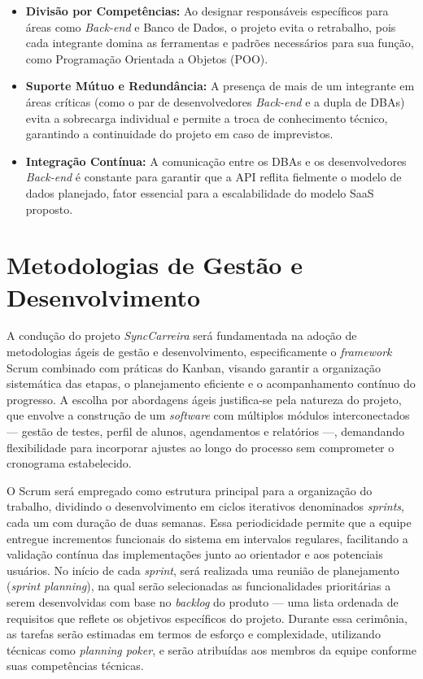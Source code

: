 \begin{itemize}
    \item \textbf{Divisão por Competências:} Ao designar responsáveis específicos para áreas como \textit{Back-end} e Banco de Dados, o projeto evita o retrabalho, pois cada integrante domina as ferramentas e padrões necessários para sua função, como Programação Orientada a Objetos (POO).

    \item \textbf{Suporte Mútuo e Redundância:} A presença de mais de um integrante em áreas críticas (como o par de desenvolvedores \textit{Back-end} e a dupla de DBAs) evita a sobrecarga individual e permite a troca de conhecimento técnico, garantindo a continuidade do projeto em caso de imprevistos.

    \item \textbf{Integração Contínua:} A comunicação entre os DBAs e os desenvolvedores \textit{Back-end} é constante para garantir que a API reflita fielmente o modelo de dados planejado, fator essencial para a escalabilidade do modelo SaaS proposto.
\end{itemize}

\section{Metodologias de Gestão e Desenvolvimento}

A condução do projeto \textit{SyncCarreira} será fundamentada na adoção de metodologias ágeis de gestão e desenvolvimento, especificamente o \textit{framework} Scrum combinado com práticas do Kanban, visando garantir a organização sistemática das etapas, o planejamento eficiente e o acompanhamento contínuo do progresso. A escolha por abordagens ágeis justifica-se pela natureza do projeto, que envolve a construção de um \textit{software} com múltiplos módulos interconectados --- gestão de testes, perfil de alunos, agendamentos e relatórios ---, demandando flexibilidade para incorporar ajustes ao longo do processo sem comprometer o cronograma estabelecido.

O Scrum será empregado como estrutura principal para a organização do trabalho, dividindo o desenvolvimento em ciclos iterativos denominados \textit{sprints}, cada um com duração de duas semanas. Essa periodicidade permite que a equipe entregue incrementos funcionais do sistema em intervalos regulares, facilitando a validação contínua das implementações junto ao orientador e aos potenciais usuários. No início de cada \textit{sprint}, será realizada uma reunião de planejamento (\textit{sprint planning}), na qual serão selecionadas as funcionalidades prioritárias a serem desenvolvidas com base no \textit{backlog} do produto --- uma lista ordenada de requisitos que reflete os objetivos específicos do projeto. Durante essa cerimônia, as tarefas serão estimadas em termos de esforço e complexidade, utilizando técnicas como \textit{planning poker}, e serão atribuídas aos membros da equipe conforme suas competências técnicas.

